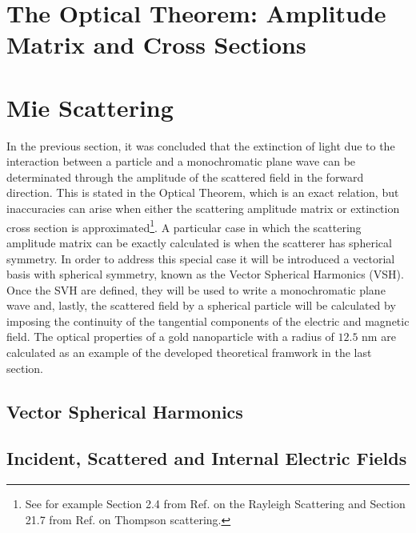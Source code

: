 \documentclass[11pt]{Latex/Classes/PhDthesisPSnPDF}
\begin{document}
	\section{The Optical Theorem: Amplitude Matrix and Cross Sections}
	 \label{s:AmpMatCrossSect}
	 

	\section{Mie Scattering}
	  \label{s:Mie}

     In the previous section, it was concluded that the extinction of light due to the interaction between a particle and a monochromatic plane wave can be determinated through the amplitude of the scattered field in the forward direction. This is stated in the Optical Theorem, which is an exact relation, but inaccuracies can arise when either the scattering amplitude matrix or extinction cross section is approximated\footnote{See for example Section 2.4 from Ref. \cite{tsang_scattering_2000} on the Rayleigh Scattering and Section 21.7 from Ref. \cite{zangwill_modern_2013} on Thompson scattering.}. A particular case in which the scattering amplitude matrix can be exactly calculated is when the scatterer has spherical symmetry. In order to address this special case it will be introduced a vectorial basis with spherical symmetry, known as the Vector Spherical Harmonics (VSH). Once the SVH are defined, they will be used to write a monochromatic plane wave and, lastly, the scattered field by a spherical particle will be calculated by imposing the continuity of the tangential components of the electric and magnetic field. The optical properties of a gold nanoparticle with a radius of $12.5$ nm are calculated as an example of the developed theoretical framwork in the last section.

	    \subsection{Vector Spherical Harmonics}
		 \label{ss:VSH}
		 

        \subsection{Incident, Scattered and Internal Electric Fields}
	     \label{ss:Fields}
         
\end{document}
